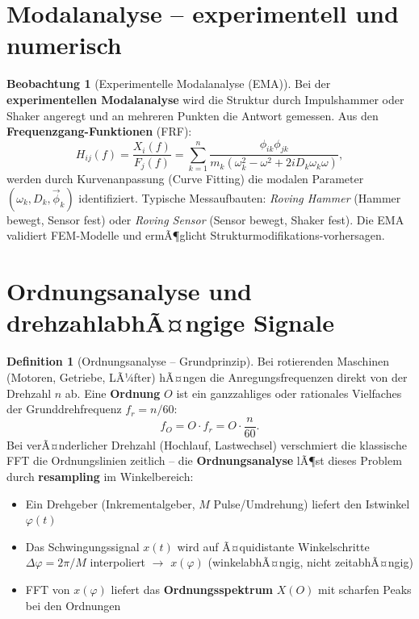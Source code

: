 ﻿\documentclass[a4paper,12pt]{report}
\theoremstyle{definition}
\newtheorem{definition}{Definition}
\newtheorem{beobachtung}{Beobachtung}
\begin{document}
\section{Modalanalyse -- experimentell und numerisch}

\begin{beobachtung}[Experimentelle Modalanalyse (EMA)]
Bei der \textbf{experimentellen Modalanalyse} wird die Struktur
durch Impulshammer oder Shaker angeregt und an mehreren Punkten
die Antwort gemessen. Aus den \textbf{Frequenzgang-Funktionen} (FRF):
\[
  H_{ij}(f) = \frac{X_i(f)}{F_j(f)} = \sum_{k=1}^n \frac{\phi_{ik}\phi_{jk}}{m_k(\omega_k^2 - \omega^2 + 2iD_k\omega_k\omega)},
\]
werden durch Kurvenanpassung (Curve Fitting) die modalen Parameter
$(\omega_k, D_k, \vec{\phi}_k)$ identifiziert.
Typische Messaufbauten: \textit{Roving Hammer} (Hammer bewegt, Sensor fest)
oder \textit{Roving Sensor} (Sensor bewegt, Shaker fest).
Die EMA validiert FEM-Modelle und ermÃ¶glicht Strukturmodifikations-vorhersagen.
\end{beobachtung}


\section{Ordnungsanalyse und drehzahlabhÃ¤ngige Signale}

\begin{definition}[Ordnungsanalyse -- Grundprinzip]
Bei rotierenden Maschinen (Motoren, Getriebe, LÃ¼fter) hÃ¤ngen die
Anregungsfrequenzen direkt von der Drehzahl $n$ ab.
Eine \textbf{Ordnung} $O$ ist ein ganzzahliges oder rationales Vielfaches
der Grunddrehfrequenz $f_r = n/60$:
\[
  f_O = O \cdot f_r = O \cdot \frac{n}{60}.
\]
Bei verÃ¤nderlicher Drehzahl (Hochlauf, Lastwechsel) verschmiert die
klassische FFT die Ordnungslinien zeitlich -- die
\textbf{Ordnungsanalyse} lÃ¶st dieses Problem durch
\textbf{resampling} im Winkelbereich:
\begin{itemize}
    \item[-] Ein Drehgeber (Inkrementalgeber, $M$ Pulse/Umdrehung) liefert
          den Istwinkel $\varphi(t)$
    \item[-] Das Schwingungssignal $x(t)$ wird auf Ã¤quidistante
          Winkelschritte $\Delta\varphi = 2\pi/M$ interpoliert
          $\to$ $x(\varphi)$ (winkelabhÃ¤ngig, nicht zeitabhÃ¤ngig)
    \item[-] FFT von $x(\varphi)$ liefert das \textbf{Ordnungsspektrum}
          $X(O)$ mit scharfen Peaks bei den Ordnungen
\end{itemize}
\end{definition}
\end{document}

